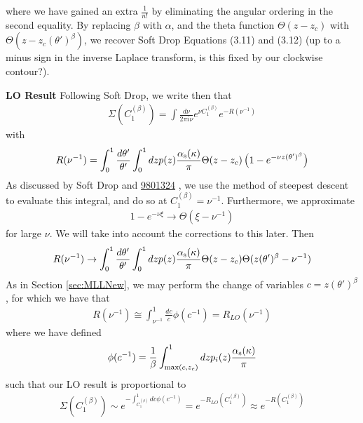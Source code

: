 where we have gained an extra \(\frac{1}{n!}\) by eliminating the angular ordering in the second equality. By replacing \(\beta\) with \(\alpha\), and the theta function \(\Theta(z - z_c)\) with \(\Theta(z - z_c (\theta')^\beta)\), we recover Soft Drop Equations (3.11) and (3.12) (up to a minus sign in the inverse Laplace transform, is this fixed by our clockwise contour?).

\textbf{LO Result}
Following Soft Drop, we write then that
\begin{align}
    \Sigma(C_1^{(\beta)}) = \int \frac{d\nu}{2\pi i\nu} e^{\nu C_1^{(\beta)}} e^{-R(\nu^{-1})}
    \label{eq:inverseLaplace}
\end{align}
with
\begin{align}
    R(\nu^{-1}) = \int_0^1\frac{d\theta'}{\theta'}\int_0^1 dz p(z) \frac{\alpha_{\mathrm{s}}(\kappa)}{\pi}\Theta(z-z_c)\left(1 - e^{-\nu z (\theta')^\beta} \right)
\end{align}
As discussed by Soft Drop and \href{https://arxiv.org/pdf/hep-ph/9801324.pdf}{9801324} , we use the method of steepest descent to evaluate this integral, and do so at \(C_1^{(\beta)} = \nu^{-1}\). Furthermore, we approximate
\begin{align}
    1 - e^{-\nu \xi} \to \Theta(\xi - \nu^{-1})
\end{align}
for large \(\nu\). We will take into account the corrections to this later. Then
\begin{align}
    R(\nu^{-1}) \to \int_0^1\frac{d\theta'}{\theta'}\int_0^1 dz p(z) \frac{\alpha_{\mathrm{s}}(\kappa)}{\pi}\Theta(z-z_c) \Theta(z (\theta')^\beta - \nu^{-1})
\end{align}
As in Section \ref{sec:MLLNew}, we may perform the change of variables \(c = z(\theta')^{\beta}\), for which we have that
\begin{align}
    R(\nu^{-1}) \cong \int_{\nu^{-1}}^1 \frac{dc}{c} \phi(c^{-1}) = R_{LO}(\nu^{-1})
\end{align}
where we have defined
\begin{align}
    \phi(c^{-1}) = \frac{1}{\beta}\int_{\max(c, z_c)}^1 dz p_i(z) \frac{\alpha_{\mathrm{s}}(\kappa)}{\pi}
\end{align}
such that our LO result is proportional to
\begin{align}
    \Sigma(C_1^{(\beta)}) \sim e^{- \int_{C_1^{(\beta)}}^1 dc \phi(c^{-1})} = e^{-R_{LO}(C_1^{(\beta)})} \approx e^{-R(C_1^{(\beta)})}
\end{align}

